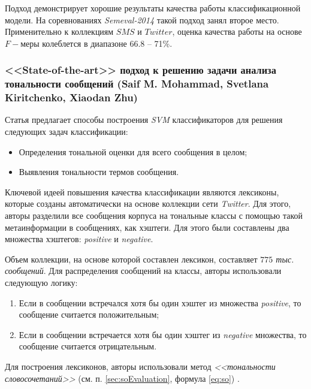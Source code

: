     Подход демонстрирует хорошие результаты качества работы классификационной
    модели. На соревнованиях {\it Semeval-2014} такой подход занял второе
    место.
    Применительно к коллекциям $SMS$ и $Twitter$, оценка качества работы на
    основе $F-$меры колеблется в диапазоне 66.8 -- 71\%.

    \subsubsection{<<State-of-the-art>> подход к решению задачи
        анализа тональности сообщений (Saif M. Mohammad, Svetlana Kiritchenko, Xiaodan Zhu)}

    Статья \cite{modernApproach} предлагает способы построения {\it SVM}
    классификаторов для решения следующих задач классификации:
    \begin{itemize}
        \item Определения тональной оценки для всего сообщения в целом;
        \item Выявления тональности термов сообщения.
    \end{itemize}

    Ключевой идеей повышения качества классификации являются лексиконы,
    которые созданы автоматически на основе коллекции сети {\it Twitter}.
    Для этого, авторы разделили все сообщения корпуса на тональные классы с
    помощью такой метаинформации в сообщениях, как хэштеги.
    Для этого были составлены два множества хэштегов: {\it positive} и
    {\it negative}.

    Объем коллекции, на основе которой составлен лексикон, составляет {\it $775$
    тыс. сообщений}. Для распределения сообщений на классы, авторы использовали
    следующую логику:
    \begin{enumerate}
        \item Если в сообщении встречался хотя бы один хэштег из множества {\it positive}, то
            сообщение считается положительным;
        \item Если в сообщении встречается хотя бы один хэштег из {\it negative} множества, то
            сообщение считается отрицательным.
    \end{enumerate}

    Для построения лексиконов, авторы использовали метод {\it <<тональности словосочетаний>>}
    (см. п. \ref{sec:soEvaluation}, формула \ref{eq:so}) \cite{lexiconSO}.

